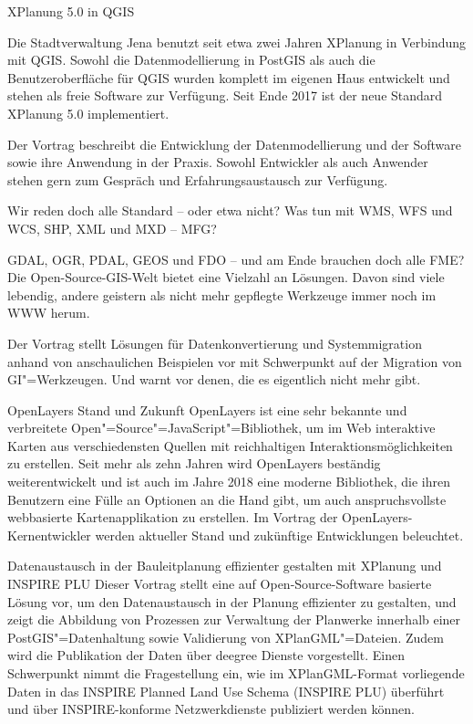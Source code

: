%
{XPlanung 5.0 in QGIS}%
{}%
{
Die Stadtverwaltung Jena benutzt seit etwa zwei Jahren XPlanung in Verbindung mit QGIS. Sowohl die
Datenmodellierung in PostGIS als auch die Benutzeroberfläche für QGIS wurden komplett im eigenen
Haus entwickelt und stehen als freie Software zur Verfügung. Seit Ende 2017 ist der neue Standard
XPlanung 5.0 implementiert.

Der Vortrag beschreibt die Entwicklung der Datenmodellierung und der
Software sowie ihre Anwendung in der Praxis. Sowohl Entwickler als auch Anwender stehen gern zum
Gespräch und Erfahrungsaustausch zur Verfügung.
}


%
{Wir reden doch alle Standard -- oder etwa nicht?}%
{Was tun mit WMS, WFS und WCS, SHP, XML und MXD -- MFG?}%
{
GDAL, OGR, PDAL, GEOS und FDO -- und am Ende brauchen doch alle FME?
Die Open-Source-GIS-Welt bietet eine Vielzahl an Lösungen. Davon sind viele lebendig, andere
geistern als nicht mehr gepflegte Werkzeuge immer noch im WWW herum.

Der Vortrag stellt Lösungen
für Datenkonvertierung und Systemmigration anhand von anschaulichen Beispielen vor mit Schwerpunkt auf
der Migration von GI"=Werkzeugen. Und warnt vor denen, die es eigentlich nicht mehr gibt.%
}

%
{OpenLayers}%
{Stand und Zukunft}%
{
OpenLayers ist eine sehr bekannte und verbreitete Open"=Source"=JavaScript"=Bibliothek, um im Web
interaktive Karten aus verschiedensten Quellen mit reichhaltigen Interaktionsmöglichkeiten zu erstellen.
Seit mehr als zehn Jahren wird OpenLayers beständig weiterentwickelt und ist auch im Jahre 2018 eine
moderne Bibliothek, die ihren Benutzern eine Fülle an Optionen an die Hand gibt, um auch
anspruchsvollste webbasierte Kartenapplikation zu erstellen.
%
Im Vortrag der OpenLayers-Kernentwickler werden aktueller Stand und zukünftige Entwicklungen
beleuchtet.%
}

%
{Datenaustausch in der Bauleitplanung effizienter gestalten mit XPlanung und INSPIRE PLU}%
{}%
{
Dieser Vortrag stellt eine auf Open-Source-Software basierte Lösung vor, um den Datenaustausch in der
Planung effizienter zu gestalten, und zeigt die Abbildung von Prozessen zur Verwaltung der Planwerke
innerhalb einer PostGIS"=Datenhaltung sowie Validierung von XPlanGML"=Dateien. Zudem wird die
Publikation der Daten über deegree Dienste vorgestellt.  Einen Schwerpunkt nimmt die Fragestellung
ein, wie im XPlanGML-Format vorliegende Daten in das INSPIRE Planned Land Use Schema (INSPIRE PLU) überführt
und über INSPIRE-konforme Netzwerkdienste publiziert werden können.%
}

